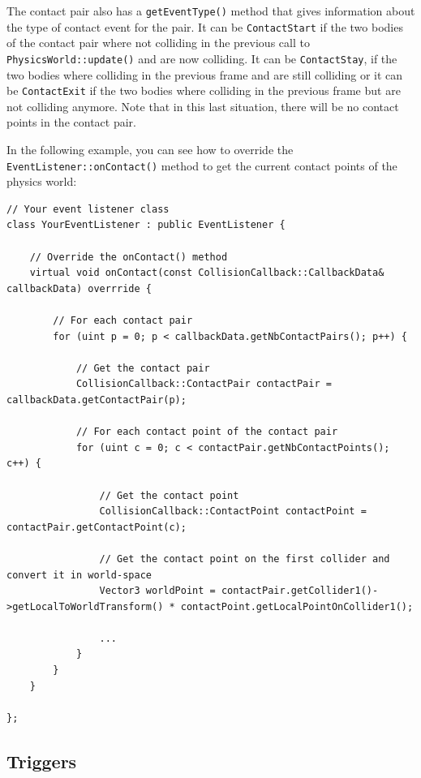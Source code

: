 \documentclass[a4paper,12pt]{article}
\begin{document}
    \begin{sloppypar}
    The contact pair also has a \texttt{getEventType()} method that gives information about the type of contact event for the pair. It can be
    \texttt{ContactStart} if the two bodies of the contact pair where not colliding in the previous call to \texttt{PhysicsWorld::update()} and are now
    colliding. It can be \texttt{ContactStay}, if the two bodies where colliding in the previous frame and are still colliding or it can be
    \texttt{ContactExit} if the two bodies where colliding in the previous frame but are not colliding anymore. Note that in this last situation, there
    will be no contact points in the contact pair. \\
    \end{sloppypar}

    \begin{sloppypar}
    In the following example, you can see how to override the \texttt{EventListener::onContact()} method to get the current contact points of the physics
    world: \\
    \end{sloppypar}

    \begin{lstlisting}
// Your event listener class
class YourEventListener : public EventListener {

	// Override the onContact() method
	virtual void onContact(const CollisionCallback::CallbackData& callbackData) overrride {

		// For each contact pair
		for (uint p = 0; p < callbackData.getNbContactPairs(); p++) {

			// Get the contact pair
			CollisionCallback::ContactPair contactPair = callbackData.getContactPair(p);

			// For each contact point of the contact pair
			for (uint c = 0; c < contactPair.getNbContactPoints(); c++) {

			    // Get the contact point
			    CollisionCallback::ContactPoint contactPoint = contactPair.getContactPoint(c);

			    // Get the contact point on the first collider and convert it in world-space
			    Vector3 worldPoint = contactPair.getCollider1()->getLocalToWorldTransform() * contactPoint.getLocalPointOnCollider1();

			    ...
			}
		}
	}

};
    \end{lstlisting}

    \subsection{Triggers}
    \label{sec:eventlistenertriggers}
\end{document}

